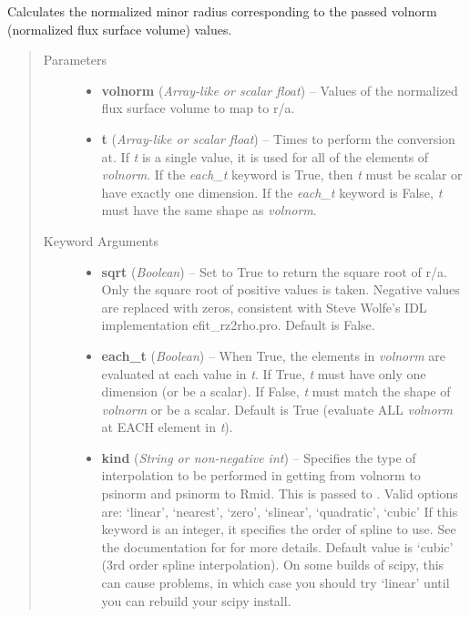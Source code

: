 \documentclass[letterpaper,10pt,english]{sphinxmanual}
\begin{document}
\begin{fulllineitems}
\begin{fulllineitems}
\end{fulllineitems}


\begin{fulllineitems}
\label{eqtools:eqtools.core.Equilibrium.volnorm2roa}
Calculates the normalized minor radius corresponding to the passed volnorm (normalized flux surface volume) values.
\begin{quote}\begin{description}
\item[{Parameters}] \leavevmode\begin{itemize}
\item {} 
\textbf{volnorm} (\emph{Array-like or scalar float}) --
Values of the normalized
flux surface volume to map to r/a.

\item {} 
\textbf{t} (\emph{Array-like or scalar float}) --
Times to perform the conversion at.
If \emph{t} is a single value, it is used for all of the elements of
\emph{volnorm}. If the \emph{each\_t} keyword is True, then \emph{t} must be scalar
or have exactly one dimension. If the \emph{each\_t} keyword is False,
\emph{t} must have the same shape as \emph{volnorm}.

\end{itemize}

\item[{Keyword Arguments}] \leavevmode\begin{itemize}
\item {} 
\textbf{sqrt} (\emph{Boolean}) --
Set to True to return the square root of r/a.
Only the square root of positive values is taken. Negative
values are replaced with zeros, consistent with Steve Wolfe's
IDL implementation efit\_rz2rho.pro. Default is False.

\item {} 
\textbf{each\_t} (\emph{Boolean}) --
When True, the elements in \emph{volnorm} are evaluated
at each value in \emph{t}. If True, \emph{t} must have only one dimension
(or be a scalar). If False, \emph{t} must match the shape of \emph{volnorm}
or be a scalar. Default is True (evaluate ALL \emph{volnorm} at EACH
element in \emph{t}).

\item {} 
\textbf{kind} (\emph{String or non-negative int}) --
Specifies the type of
interpolation to be performed in getting from volnorm to
psinorm and psinorm to Rmid. This is passed to
. Valid options are:
`linear', `nearest', `zero', `slinear', `quadratic', `cubic'
If this keyword is an integer, it specifies the order of spline
to use. See the documentation for  for more
details. Default value is `cubic' (3rd order spline
interpolation). On some builds of scipy, this can cause problems,
in which case you should try `linear' until you can rebuild your
scipy install.


\end{itemize}
\end{description}
\end{quote}
\end{fulllineitems}
\end{fulllineitems}
\end{document}
